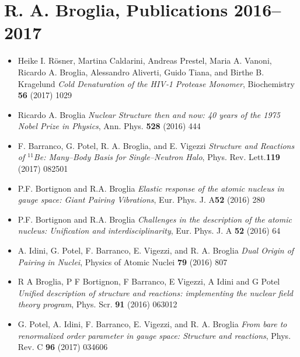 \documentclass[a4paper,12pt]{book}
\begin{document}
\section*{R. A. Broglia, Publications 2016--2017}
\begin{itemize}
\item Heike I. R\"osner, Martina Caldarini, Andreas Prestel, Maria A. Vanoni, Ricardo A. Broglia, Alessandro Aliverti, Guido Tiana, and Birthe B. Kragelund \textit{Cold Denaturation of the HIV‐1 Protease Monomer}, Biochemistry \textbf{56} (2017) 1029
\item Ricardo A. Broglia \textit{Nuclear Structure then and now: 40 years of the 1975 Nobel
Prize in Physics}, Ann. Phys. \textbf{528} (2016) 444
\item F. Barranco, G. Potel,  R. A. Broglia,  and E. Vigezzi  \textit{Structure and Reactions of
$^{11}$Be:
Many--Body Basis for Single--Neutron Halo}, Phys. Rev. Lett.\textbf{119} (2017) 082501
\item P.F. Bortignon and R.A. Broglia \textit{Elastic response of the atomic nucleus in gauge
space: Giant Pairing Vibrations}, Eur. Phys. J. A\textbf{52} (2016) 280
\item P.F. Bortignon and R.A. Broglia \textit{Challenges in the description of the atomic nucleus: Unification
and interdisciplinarity}, Eur. Phys. J. A \textbf{52} (2016) 64
\item A. Idini, G. Potel, F. Barranco, E. Vigezzi, and R. A. Broglia \textit{Dual Origin of Pairing in Nuclei}, Physics of Atomic Nuclei \textbf{79} (2016) 807
\item R A Broglia, P F Bortignon, F Barranco, E Vigezzi, A Idini and
G Potel \textit{Unified description of structure and
reactions: implementing the nuclear field
theory program}, Phys. Scr. \textbf{91} (2016) 063012
\item G. Potel, A. Idini,  F. Barranco, E. Vigezzi, and R. A. Broglia \textit{From bare to renormalized order parameter in gauge space: Structure and reactions}, Phys. Rev. C \textbf{96} (2017) 034606
\end{itemize}
\end{document}
